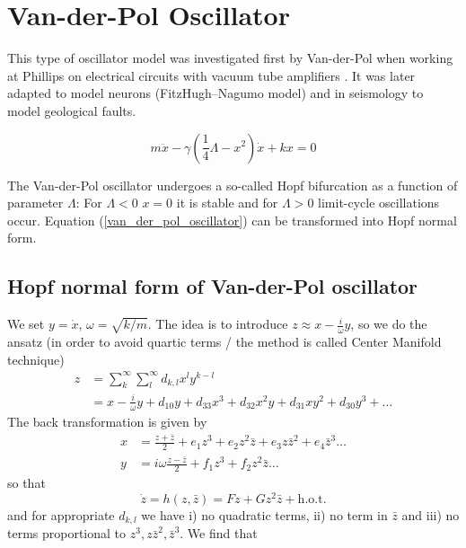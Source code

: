 \documentclass{notebook}
\begin{document}
\section{Van-der-Pol Oscillator}

This type of oscillator model was investigated first by Van-der-Pol when working at Phillips on electrical circuits with vacuum tube amplifiers \cite{Vanderpol1927}. It was later adapted to model neurons (FitzHugh–Nagumo model) and in seismology to model geological faults. 

%
\begin{theorem}
	\begin{equation}
	m \ddot{x} - \gamma \left(\frac{1}{4} \Lambda - x^2 \right) \dot{x} + kx = 0
	\label{van_der_pol_oscillator}
	\end{equation}
\end{theorem}
%
The Van-der-Pol oscillator undergoes a so-called Hopf bifurcation as a function of parameter $\Lambda$: For $\Lambda < 0$ $x = 0$ it is stable and for $\Lambda > 0$ limit-cycle oscillations occur. Equation (\ref{van_der_pol_oscillator}) can be transformed into Hopf normal form. 


\subsection*{Hopf normal form of Van-der-Pol oscillator}

We set $y = \dot{x}$, $\omega = \sqrt{k/m}$. The idea is to introduce $z \approx x - \frac{i}{\omega} y$, so we do the ansatz (in order to avoid quartic terms / the method is called Center Manifold technique)
%
\begin{align*}
	z &= \sum_{k}^{\infty}\sum_{l}^{\infty}{d_{k,l}x^l y^{k-l}} \\
	&= x - \frac{i}{\omega} y + d_{10}y + d_{33}x^3 + d_32 x^2 y + d_{31} xy^2 + d_{30} y^3 + \dots
\end{align*}
%
The back transformation is given by
%
\begin{align*}
	x &= \frac{z + \bar{z}}{2} + e_1 z^3 + e_2 z^2 \bar{z} + e_3 z \bar{z}^2 + e_4 \bar{z}^3 \dots \\
	y &= i \omega \frac{z - \bar{z}}{2} + f_1 z^3 + f_2 z^2 \bar{z} \dots
\end{align*}
%
so that
%
\begin{equation}
\dot{z} = h(z, \bar{z}) = Fz + G z^2 \bar{z} + \mathrm{h.o.t.}
\end{equation}
%
and for appropriate $d_{k,l}$ we have i) no quadratic terms, ii) no term in $\bar{z}$ and iii) no terms proportional to $z^3, z\bar{z}^2, \bar{z}^3$. We find that
\end{document}

